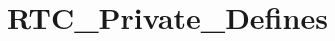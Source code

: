 \hypertarget{group___r_t_c___private___defines}{\section{R\-T\-C\-\_\-\-Private\-\_\-\-Defines}
\label{group___r_t_c___private___defines}
}
